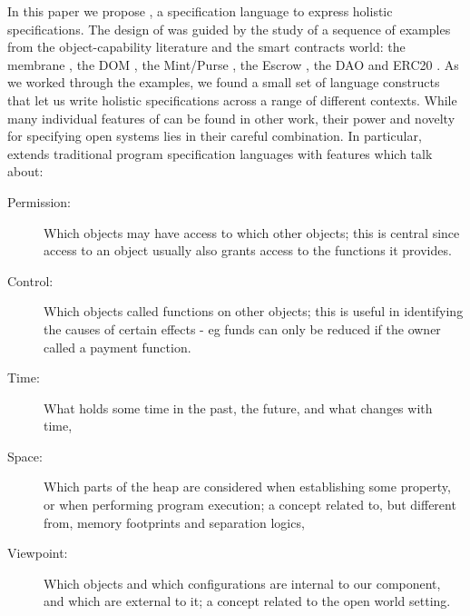 In this paper we propose \Chainmail, a specification language to
express holistic specifications.
The design of \Chainmail was guided by the study of a sequence of
examples from the object-capability literature and the smart contracts world: the
membrane \cite{membranesJavascript}, the DOM \cite{dd,ddd}, the Mint/Purse \cite{MillerPhD}, the Escrow \cite{proxiesECOOP2013}, the DAO \cite{Dao,DaoBug} and
ERC20 \cite{ERC20}.  As we worked through the
examples, we found a small set of language constructs that let us
write holistic specifications across a range of different contexts.
%
While many individual features of \Chainmail can be found in other work, 
their power and novelty for specifying open systems lies in their careful combination.
In particular, \Chainmail extends 
traditional program specification languages \cite{Leavens-etal07,Meyer92} with features which talk about:
%
\begin{description}
\item[Permission: ] 
Which objects may have access to which other objects; 
this is central since access to an object usually also grants access to the functions it provides.
%
\item[Control: ]
Which objects called functions on other objects; this
 is useful in identifying the causes of certain effects - eg 
funds can only be reduced if the owner called a payment function.
%
%
\item[Time: ]
What holds some time in  the past, the future, and what changes with time,
\item[Space: ]
Which parts of the heap are considered when establishing some property, or when 
performing program execution; a concept
related to, but different from, memory footprints and separation logics,
\item[Viewpoint: ]
Which objects and which configurations are internal to our component, and which  are
external to it;
a concept related to the open world setting.
\end{description}


